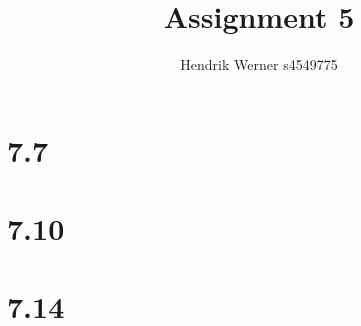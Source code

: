 \documentclass[12pt]{article}
\title{Assignment 5}
\author{Hendrik Werner s4549775}
\begin{document}
\maketitle

\section*{7.7}
\section*{7.10}
\section*{7.14}
\end{document}
